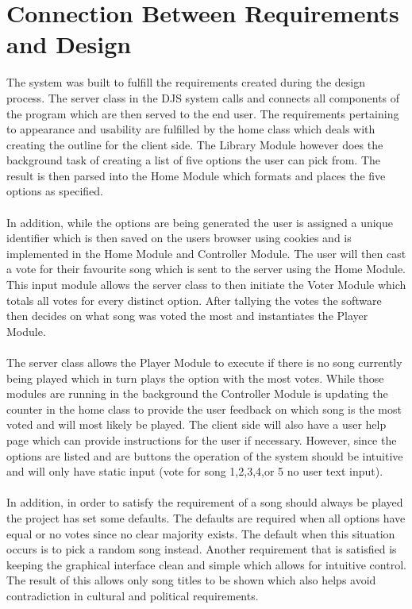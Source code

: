 \documentclass[12pt, titlepage]{article}
\begin{document}
\section{Connection Between Requirements and Design} \label{SecConnection}
The system was built to fulfill the requirements created during the design process. The server class in the DJS system calls and connects all components of the program which are then served to the end user. The requirements pertaining to appearance and usability are fulfilled by the home class which deals with creating the outline for the client side. The Library Module however does the background task of creating a list of five options the user can pick from. The result is then parsed into the Home Module which formats and places the five options as specified. \\\\In addition, while the options are being generated the user is assigned a unique identifier which is then saved on the users browser using cookies and is implemented in the Home Module and Controller Module. The user will then cast a vote for their favourite song which is sent to the server using the Home Module. This input module allows the server class to then initiate the Voter Module which totals all votes for every distinct option. After tallying the votes the software then decides on what song was voted the most and instantiates the Player Module. \\\\The server class allows the Player Module to execute if there is no song currently being played which in turn plays the option with the most votes. While those modules are running in the background the Controller Module is updating the counter in the home class to provide the user feedback on which song is the most voted and will most likely be played. The client side will also have a user help page which can provide instructions for the user if necessary. However, since the options are listed and are buttons the operation of the system should be intuitive and will only have static input (vote for song 1,2,3,4,or 5 no user text input).\\\\ In addition, in order to satisfy the requirement of a song should always be played the project has set some defaults. The defaults are required when all options have equal or no votes since no clear majority exists. The default when this situation occurs is to pick a random song instead. Another requirement that is satisfied is keeping the graphical interface clean and simple which allows for intuitive control. The result of this allows only song titles to be shown which also helps avoid contradiction in cultural and political requirements.
\end{document}
